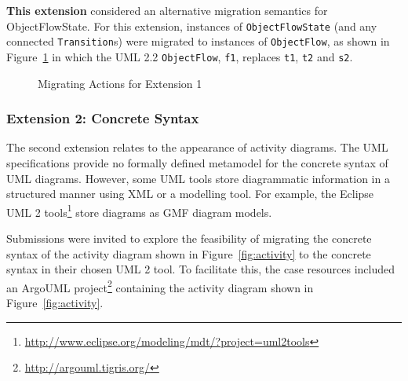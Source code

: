 \textbf{This extension} considered an alternative migration semantics for ObjectFlowState. For this extension, instances of \texttt{Ob\-je\-ctFl\-owSt\-a\-te} (and any connected \texttt{Tr\-an\-si\-ti\-on}s) were migrated to instances of  \texttt{Ob\-je\-ctFl\-ow}, as shown in Figure~\ref{fig:ofs_to_flow} in which the UML 2.2 \texttt{Ob\-je\-ctFl\-ow}, \texttt{f1}, replaces \texttt{t1}, \texttt{t2} and \texttt{s2}.

\begin{figure}[htbp]
	\centering
	\caption{Migrating Actions for Extension 1}
\label{fig:ofs_to_flow}
\end{figure}

\subsubsection{Extension 2: Concrete Syntax}
\label{sub:concrete_syntax}
The second extension relates to the appearance of activity diagrams. The UML specifications provide no formally defined metamodel for the concrete syntax of UML diagrams. However, some UML tools store diagrammatic information in a structured manner using XML or a modelling tool. For example, the Eclipse UML 2 tools\footnote{\url{http://www.eclipse.org/modeling/mdt/?project=uml2tools}} store diagrams as GMF \cite{gronback09emp} diagram models.

Submissions were invited to explore the feasibility of migrating the concrete syntax of the activity diagram shown in Figure~\ref{fig:activity} to the concrete syntax in their chosen UML 2 tool. To facilitate this, the case resources included an ArgoUML project\footnote{\url{http://argouml.tigris.org/}} containing the activity diagram shown in Figure~\ref{fig:activity}.

